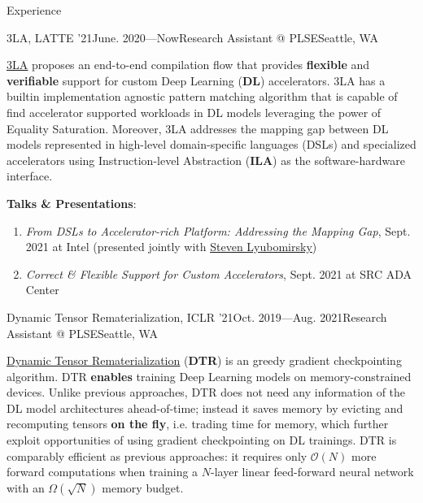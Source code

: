 \documentclass{resume}
\newcommand{\myul}[2][blue]{\setulcolor{#1}\ul{#2}\setulcolor{blue}}
\begin{document}
    \begin{rSection}{Experience}
        \begin{rSubsection}{3LA, LATTE '21}{June. 2020---Now}{Research Assistant @ PLSE}{Seattle, WA}
            \item \href{https://capra.cs.cornell.edu/latte21/paper/30.pdf}{\color{blue} \myul{3LA}} proposes an end-to-end compilation flow that provides \textbf{flexible} and \textbf{verifiable} support for custom Deep Learning (\textbf{DL}) accelerators. 3LA has a builtin implementation agnostic pattern matching algorithm that is capable of find accelerator supported workloads in DL models leveraging the power of Equality Saturation. Moreover, 3LA addresses the mapping gap between DL models represented in high-level domain-specific languages (DSLs) and specialized accelerators using Instruction-level Abstraction (\textbf{ILA}) as the software-hardware interface.
            \item \textbf{Talks \& Presentations}:
            \vspace{-5pt}
                \begin{enumerate}
                    \setlength{\itemsep}{1pt}
                    \setlength{\parskip}{0pt}
                    \setlength{\parsep}{0pt}
                    \item \textit{From DSLs to Accelerator-rich Platform: Addressing the Mapping Gap}, Sept. 2021 at Intel (presented jointly with \href{https://homes.cs.washington.edu/~sslyu/}{\color{blue} \myul {Steven Lyubomirsky}})
                    \item \textit{Correct \& Flexible Support for Custom Accelerators}, Sept. 2021 at SRC ADA Center
                \end{enumerate} 
        \end{rSubsection}
        \vspace{-5pt}
        \begin{rSubsection}{Dynamic Tensor Rematerialization, ICLR '21}{Oct. 2019---Aug. 2021}{Research Assistant @ PLSE}{Seattle, WA}
            \item \href{https://github.com/uwsampl/dtr-prototype}{\color{blue} \myul{Dynamic Tensor Rematerialization}} (\textbf{DTR}) is an greedy gradient checkpointing algorithm. DTR \textbf{enables} training Deep Learning models on memory-constrained devices. Unlike previous approaches, DTR does not need any information of the DL model architectures ahead-of-time; instead it saves memory by evicting and recomputing tensors \textbf{on the fly}, i.e. trading time for memory, which further exploit opportunities of using gradient checkpointing on DL trainings. DTR is comparably efficient as previous approaches: it requires only $\mathcal{O}(N)$ more forward computations when training a $N$-layer linear feed-forward neural network with an $\Omega(\sqrt{N})$ memory budget.

\end{rSubsection}
\end{rSection}
\end{document}

